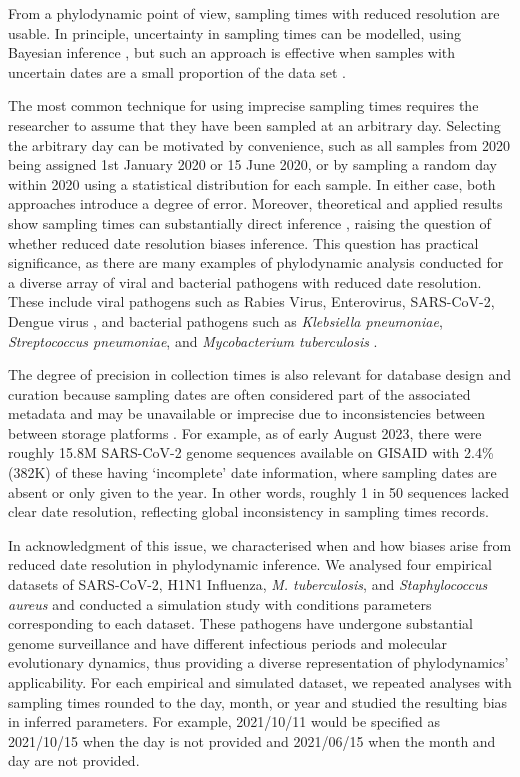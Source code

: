 \documentclass[11pt]{article}
\begin{document}
\begin{spacing}{1.5}
From a phylodynamic point of view, sampling times with reduced resolution are usable. In principle, uncertainty in sampling times can be modelled, using Bayesian inference \citep{shapiro2011bayesian}, but such an approach is effective when samples with uncertain dates are a small proportion of the data set \citep{rieux2017tipdatingbeast}.

The most common technique for using imprecise sampling times requires the researcher to assume that they have been sampled at an arbitrary day. Selecting the arbitrary day can be motivated by convenience, such as all samples from 2020 being assigned 1st January 2020 or 15 June 2020, or by sampling a random day within 2020 using a statistical distribution for each sample. In either case, both approaches introduce a degree of error. Moreover, theoretical and applied results show sampling times can substantially direct inference \citep{featherstone_decoding_2023,featherstone_infectious_2021,volz_sampling_2014}, raising the question of whether reduced date resolution biases inference. This question has practical significance, as there are many examples of phylodynamic analysis conducted for a diverse array of viral and bacterial pathogens with reduced date resolution. These include viral pathogens such as Rabies Virus, Enterovirus, SARS-CoV-2, Dengue virus \citep{talbi_phylodynamics_2010,xiao_genomic_2022,wolf_temporal_2022,bennett_epidemic_2010}, and bacterial pathogens such as \textit{Klebsiella pneumoniae}, \textit{Streptococcus pneumoniae}, and \textit{Mycobacterium tuberculosis} \citep{cella_multi-drug_2017,azarian_impact_2018,merker_evolutionary_2015}. 

The degree of precision in collection times is also relevant for database design and curation because sampling dates are often considered part of the associated metadata and may be unavailable or imprecise due to inconsistencies between between storage platforms \citep{raza2016big}. For example, as of early August 2023, there were roughly 15.8M SARS-CoV-2 genome sequences available on GISAID with 2.4\% (382K) of these having `incomplete' date information, where sampling dates are absent or only given to the year. In other words, roughly 1 in 50 sequences lacked clear date resolution, reflecting global inconsistency in sampling times records.

In acknowledgment of this issue, we characterised when and how biases arise from reduced date resolution in phylodynamic inference. We analysed four empirical datasets of SARS-CoV-2, H1N1 Influenza, \textit{M. tuberculosis}, and \textit{Staphylococcus aureus} and conducted a simulation study with conditions parameters corresponding to each dataset. These pathogens have undergone substantial genome surveillance and have different infectious periods and molecular evolutionary dynamics, thus providing a diverse representation of phylodynamics' applicability. For each empirical and simulated dataset, we repeated analyses with sampling times rounded to the day, month, or year and studied the resulting bias in inferred parameters. For example, 2021/10/11 would be specified as 2021/10/15 when the day is not provided and 2021/06/15 when the month and day are not provided.


\end{spacing}
\end{document}
